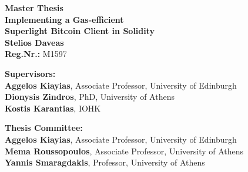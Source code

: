 \begin{center}
    \vspace{3cm}
    \large \textbf{Master Thesis}\\
    \vspace{3cm}
    \textbf{Implementing a Gas-efficient\\Superlight Bitcoin Client in Solidity}\\
    \vspace{3cm}
    \large \textbf{Stelios Daveas}\\
    \textbf{Reg.Nr.:} M1597

    \vspace{5cm}
    \begin{flushleft}
        \textbf{Supervisors:}\\
        \hspace{1.5cm}
        \textbf{Aggelos Kiayias}, Associate Professor, University of Edinburgh\\
        \hspace{1.5cm}
        \textbf{Dionysis Zindros}, PhD, University of Athens\\
        \hspace{1.5cm}
        \textbf{Kostis Karantias}, IOHK

        \vspace{1cm}

        \textbf{Thesis Committee:}\\
        \hspace{1.5cm}
        \textbf{Aggelos Kiayias}, Associate Professor, University of Edinburgh\\
        \hspace{1.5cm}
        \textbf{Mema Roussopoulos}, Associate Professor, University of Athens\\
        \hspace{1.5cm}
        \textbf{Yannis Smaragdakis}, Professor, University of Athens

    \end{flushleft}
\end{center}
\pagebreak
